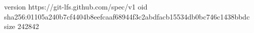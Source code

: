 version https://git-lfs.github.com/spec/v1
oid sha256:01105a240b7cf4404b8eefcaaf68944f3c2abdfacb15534db0bc746c1438bbdc
size 242842
